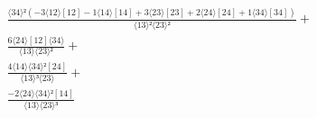 \documentclass[varwidth, border=5pt]{standalone}
\begin{document}
\begin{my}
$\begin{gathered}
\scriptscriptstyle\frac{⟨34⟩²(-3⟨12⟩[12]-1⟨14⟩[14]+3⟨23⟩[23]+2⟨24⟩[24]+1⟨34⟩[34])}{⟨13⟩²⟨23⟩²} +\\
\scriptscriptstyle\frac{6⟨24⟩[12]⟨34⟩}{⟨13⟩⟨23⟩²} +\\
\scriptscriptstyle\frac{4⟨14⟩⟨34⟩²[24]}{⟨13⟩³⟨23⟩} +\\
\scriptscriptstyle\frac{-2⟨24⟩⟨34⟩²[14]}{⟨13⟩⟨23⟩³} \phantom{+}
\end{gathered}$
\end{my}
\end{document}
